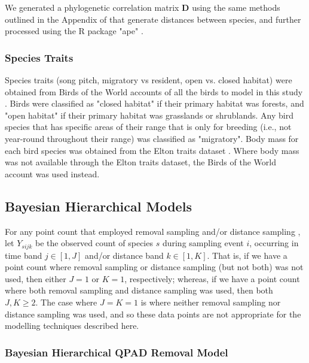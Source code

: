\documentclass[12pt]{article}
\begin{document}
\par We generated a phylogenetic correlation matrix $\mathbf{D}$ using the same methods outlined in the Appendix of \citet{solymos_phylogeny_2018} that generate distances between species, and further processed using the R package "ape" \citet{paradis_ape_2019}.

\subsubsection{Species Traits}
\par Species traits (song pitch, migratory vs resident, open vs. closed habitat) were obtained from Birds of the World accounts of all the birds to model in this study \citep{billerman_birds_2022}. 
Birds were classified as "closed habitat" if their primary habitat was forests, and "open habitat" if their primary habitat was grasslands or shrublands.
Any bird species that has specific areas of their range that is only for breeding (i.e., not year-round throughout their range) was classified as "migratory".
Body mass for each bird species was obtained from the Elton traits dataset \citep{wilman_eltontraits_2014}. 
Where body mass was not available through the Elton traits dataset, the Birds of the World account \citep{billerman_birds_2022} was used instead.

\subsection{Bayesian Hierarchical Models}

\par For any point count that employed removal sampling \citep{alldredge_time--detection_2007, farnsworth_removal_2002} and/or distance sampling \citep{buckland_introduction_2001, buckland_distance_2015}, let $Y_{sijk}$ be the observed count of species $s$ during sampling event $i$, occurring in time band $j \in [1,J]$ and/or distance band $k \in [1,K]$.
That is, if we have a point count where removal sampling or distance sampling (but not both) was not used, then either $J = 1$ or $K = 1$, respectively; whereas, if we have a point count where both removal sampling and distance sampling was used, then both $J,K \geq 2$.
The case where $J = K = 1$ is where neither removal sampling nor distance sampling was used, and so these data points are not appropriate for the modelling techniques described here.

\subsubsection{Bayesian Hierarchical QPAD Removal Model}
\end{document}
